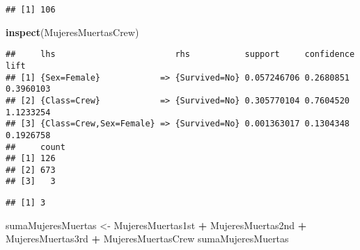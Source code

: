 \documentclass[]{article}
\newenvironment{Shaded}{\begin{snugshade}}{\end{snugshade}}
\newcommand{\DecValTok}[1]{\textcolor[rgb]{0.00,0.00,0.81}{#1}}
\newcommand{\KeywordTok}[1]{\textcolor[rgb]{0.13,0.29,0.53}{\textbf{#1}}}
\newcommand{\NormalTok}[1]{#1}
\newcommand{\OperatorTok}[1]{\textcolor[rgb]{0.81,0.36,0.00}{\textbf{#1}}}
\newcommand{\StringTok}[1]{\textcolor[rgb]{0.31,0.60,0.02}{#1}}
\begin{document}
\begin{Shaded}
\end{Shaded}

\begin{verbatim}
## [1] 106
\end{verbatim}

\begin{Shaded}
\begin{Highlighting}[]
\KeywordTok{inspect}\NormalTok{(MujeresMuertasCrew)}
\end{Highlighting}
\end{Shaded}

\begin{verbatim}
##     lhs                        rhs           support     confidence lift     
## [1] {Sex=Female}            => {Survived=No} 0.057246706 0.2680851  0.3960103
## [2] {Class=Crew}            => {Survived=No} 0.305770104 0.7604520  1.1233254
## [3] {Class=Crew,Sex=Female} => {Survived=No} 0.001363017 0.1304348  0.1926758
##     count
## [1] 126  
## [2] 673  
## [3]   3
\end{verbatim}

\begin{Shaded}
\end{Shaded}

\begin{verbatim}
## [1] 3
\end{verbatim}

\begin{Shaded}
\begin{Highlighting}[]
\NormalTok{sumaMujeresMuertas <-}\StringTok{ }\NormalTok{MujeresMuertas1st }\OperatorTok{+}\StringTok{ }\NormalTok{MujeresMuertas2nd }\OperatorTok{+}\StringTok{ }
\StringTok{  }\NormalTok{MujeresMuertas3rd }\OperatorTok{+}\StringTok{ }\NormalTok{MujeresMuertasCrew}
\NormalTok{sumaMujeresMuertas}
\end{Highlighting}
\end{Shaded}
\end{document}
